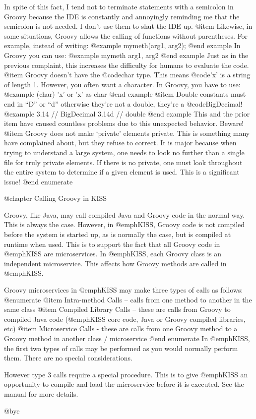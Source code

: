 In spite of this fact, I tend not to terminate statements with a
semicolon in Groovy because the IDE is constantly and annoyingly
reminding me that the semicolon is not needed.  I don't use them to
shut the IDE up.
@item   
Likewise, in some situations, Groovy allows the calling of
functions without parentheses.  For example, instead of writing:
@example   
      mymeth(arg1, arg2);
@end example
   In Groovy you can use:
@example
      mymeth arg1, arg2
@end example
Just as in the previous complaint, this increases the difficulty
for humans to evaluate the code.
@item
Groovy doesn't have the @code{char} type.  This means @code{'x'} is a string of
length 1.  However, you often want a character.  In Groovy, you
have to use:
@example   
      (char) 'x'
        or
      'x' as char
@end example
@item
Double constants must end in ``D'' or ``d'' otherwise they're not a double,
they're a @code{BigDecimal}!
@example
    3.14  // BigDecimal
    3.14d // double
@end example
This and the prior item have caused countless problems due to this unexpected
behavior.  Beware!
@item
Groovy does not make `private' elements private.  This is something
many have complained about, but they refuse to correct.  It is major
because when trying to understand a large system, one needs to look no
further than a single file for truly private elements.  If there is no
private, one must look throughout the entire system to determine if a
given element is used.  This is a significant issue!
@end enumerate    

@chapter Calling Groovy in KISS

Groovy, like Java, may call compiled Java and Groovy code in the
normal way.  This is always the case.  However, in @emph{KISS}, Groovy
code is not compiled before the system is started up, as is normally
the case, but is compiled at runtime when used.  This is to support
the fact that all Groovy code in @emph{KISS} are microservices.
In @emph{KISS}, each Groovy class is an independent microservice.
This affects how Groovy methods are called in @emph{KISS}.

Groovy microservices in @emph{KISS} may make three types of calls as follows:
@enumerate
@item
Intra-method Calls -- calls from one method to another in the same class
@item
Compiled Library Calls -- these are calls from Groovy to compiled Java
code (@emph{KISS} core code, Java or Groovy compiled libraries, etc)
@item 
Microservice Calls - these are calls from one Groovy method to a Groovy
method in another class / microservice
@end enumerate
In @emph{KISS}, the first two types of calls may be performed as you would normally
perform them.  There are no special considerations.

However type 3 calls require a special procedure.  This is to give @emph{KISS}
an opportunity to compile and load the microservice before it is executed.
See the manual for more details.

    

@bye

